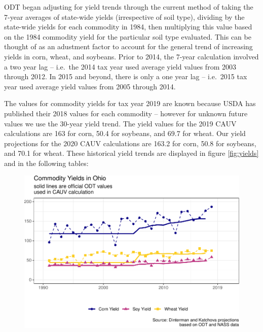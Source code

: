 \documentclass[]{article}
\begin{document}
ODT began adjusting for yield trends through the current method of
taking the 7-year averages of state-wide yields (irrespective of soil
type), dividing by the state-wide yields for each commodity in 1984,
then multiplying this value based on the 1984 commodity yield for the
particular soil type evaluated. This can be thought of as an adustment
factor to account for the general trend of increasing yields in corn,
wheat, and soybeans. Prior to 2014, the 7-year calculation involved a
two year lag -- i.e.~the 2014 tax year used average yield values from
2003 through 2012. In 2015 and beyond, there is only a one year lag --
i.e.~2015 tax year used average yield values from 2005 through 2014.

The values for commodity yields for tax year 2019 are known because USDA
has published their 2018 values for each commodity -- however for
unknown future values we use the 30-year yield trend. The yield values
for the 2019 CAUV calculations are 163 for corn, 50.4 for soybeans, and
69.7 for wheat. Our yield projections for the 2020 CAUV calculations are
163.2 for corn, 50.8 for soybeans, and 70.1 for wheat. These historical
yield trends are displayed in figure \ref{fig:yields} and in the
following tables:

\begin{figure}[H]
\includegraphics[width=1\linewidth]{4-projections-2019-2020_files/figure-latex/viz-yields-1} \caption{\label{fig:yields}}\label{fig:viz-yields}
\end{figure}

\newpage
\end{document}
